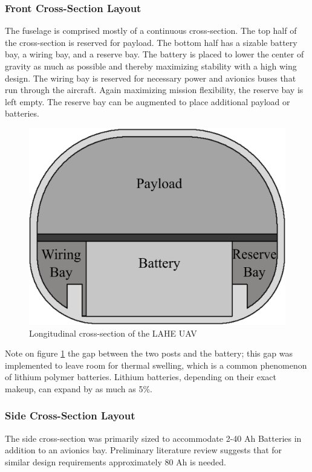 \documentclass[12pt]{article}
\begin{document}
	\subsubsection{Front Cross-Section Layout}
	The fuselage is comprised mostly of a continuous cross-section. The top half of the cross-section is reserved for payload. The bottom half has a sizable battery bay, a wiring bay, and a reserve bay. The battery is placed to lower the center of gravity as much as possible and thereby maximizing stability with a high wing design. The wiring bay is reserved for necessary power and avionics buses that run through the aircraft. Again maximizing mission flexibility, the reserve bay is left empty. The reserve bay can be augmented to place additional payload or batteries. 
	\begin{figure}[h!]
		\centering
		\includegraphics[width=6 in]{Media/FrontCrossSection.png} %
		\caption{Longitudinal cross-section of the LAHE UAV}
		\label{figure6}
	\end{figure}
	
	Note on figure \ref{figure6} the gap between the two posts and the battery; this gap was implemented to leave room for thermal swelling, which is a common phenomenon of lithium polymer batteries. Lithium batteries, depending on their exact makeup, can expand by as much as 5\%\cite{}. 
	
	
	\subsubsection{Side Cross-Section Layout}
	The side cross-section was primarily sized to accommodate 2-40 Ah Batteries in addition to an avionics bay. Preliminary literature review suggests that for similar design requirements approximately 80 Ah is needed.
	
\end{document}
